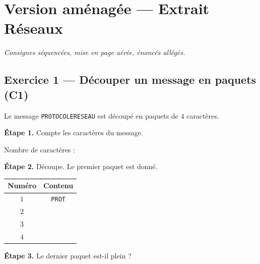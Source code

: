\section*{Version aménagée --- Extrait Réseaux}
\textit{Consignes séquencées, mise en page aérée, énoncés allégés.}

\bigskip

\subsection*{Exercice 1 --- Découper un message en paquets (C1)}

Le message \texttt{PROTOCOLERESEAU} est découpé en paquets de $4$ caractères.

\bigskip

\textbf{Étape 1.} Compte les caractères du message.

\medskip
Nombre de caractères : \dotfill

\bigskip

\textbf{Étape 2.} Découpe. Le premier paquet est donné.

\bigskip

\begin{center}
\begin{tabular}{|c|c|}
\hline
\textbf{Numéro} & \textbf{Contenu} \\
\hline
$1$ & \texttt{PROT} \\
\hline
$2$ & \dotfill \\
\hline
$3$ & \dotfill \\
\hline
$4$ & \dotfill \\
\hline
\end{tabular}
\end{center}

\bigskip

\textbf{Étape 3.} Le dernier paquet est-il plein ?

\medskip
\begin{center}
 \qquad {}
\end{center}

\bigskip


